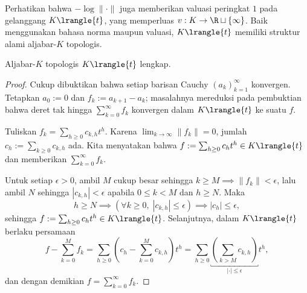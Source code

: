 Perhatikan bahwa $-\log \|\cdot\|$ juga memberikan valuasi peringkat $1$ pada gelanggang $K\lrangle{t}$, yang memperluas $v: K \to \R \sqcup \{\infty\}$. Baik menggunakan bahasa norma maupun valuasi, $K\lrangle{t}$ memiliki struktur alami aljabar-$K$ topologis.

\begin{lemma}\label{prop:strictly-convergent-series-2}
	Aljabar-$K$ topologis $K\lrangle{t}$ lengkap.
\end{lemma}
\begin{proof}
	Cukup dibuktikan bahwa setiap barisan Cauchy $(a_k)_{k=1}^\infty$ konvergen. Tetapkan $a_0 := 0$ dan $f_k := a_{k+1}-a_k$; masalahnya mereduksi pada pembuktian bahwa deret tak hingga $\sum_{k=0}^\infty f_k$ konvergen dalam $K\lrangle{t}$ ke suatu $f$.
	
	Tuliskan $f_k = \sum_{h \geq 0} c_{k,h} t^h$. Karena $\lim_{k \to \infty} \|f_k\| = 0$, jumlah $c_h := \sum_{k \geq 0} c_{k,h}$ ada. Kita menyatakan bahwa $f := \sum_{h \geq 0} c_h t^h \in K\lrangle{t}$ dan memberikan $\sum_{k=0}^\infty f_k$.
	
	Untuk setiap $\epsilon > 0$, ambil $M$ cukup besar sehingga $k \geq M \implies \|f_k\| < \epsilon$, lalu ambil $N$ sehingga $|c_{k,h}| < \epsilon$ apabila $0 \leq k < M$ dan $h \geq N$. Maka
	\[ h \geq N \implies \left( \forall k \geq 0, \; |c_{k,h}| \leq \epsilon \right) \implies |c_h| \leq \epsilon, \]
	sehingga $f := \sum_{h \geq 0} c_h t^h \in K\lrangle{t}$. Selanjutnya, dalam $K\lrangle{t}$ berlaku persamaan
	\[ f - \sum_{k=0}^M f_k = \sum_{h \geq 0} \left( c_h - \sum_{k=0}^M c_{k,h} \right) t^h = \sum_{h \geq 0} \underbracket{ \left( \sum_{k > M} c_{k,h} \right)}_{|\cdot| \leq \epsilon} t^h , \]
	dan dengan demikian $f = \sum_{k=0}^\infty f_k$.
\end{proof}

